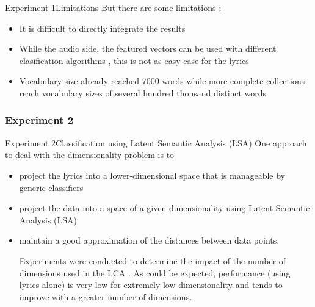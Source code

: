 \documentclass{beamer}
\begin{document}
\begin{frame}{Experiment 1}{Limitations}
But there are some limitations :
\begin{itemize}
\item
{
	It is difficult to directly integrate the results
}
\item
{
	While the audio side, the featured vectors can be used with different clasification algorithms , this is not as easy case for the lyrics
}
\item
{
	Vocabulary size already reached 7000 words while more complete collections reach vocabulary sizes of several hundred thousand distinct words
}

\end{itemize}
\end{frame}



\subsubsection{Experiment 2}

\begin{frame}{Experiment 2}{Classification using Latent Semantic Analysis (LSA) }
One approach to deal with the dimensionality problem is to
  \begin{itemize}
  \item {
    project the lyrics into a lower-dimensional space that is manageable by generic classifiers
  }
  \item 
  {
  	project the data into a space of a given dimensionality using Latent Semantic Analysis (LSA)
    
  }
  \item
  {
  	maintain a good approximation of the distances between data points.

}
Experiments were conducted to determine the impact of the number of dimensions used in the LCA . As could be expected, performance (using lyrics alone) is very low for extremely low dimensionality and tends to improve with a greater number of dimensions.
  
  
  \end{itemize}
\end{frame}
\end{document}
